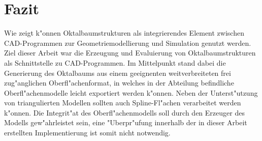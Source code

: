 %
%

\chapter{Fazit}
\label{fazit}
Wie \cite{diss_oct} zeigt k"onnen Oktalbaumstrukturen 
als integrierendes Element zwischen CAD-Programmen zur Geometriemodellierung 
und Simulation genutzt werden. Ziel dieser Arbeit war die Erzeugung und 
Evaluierung von Oktalbaumstrukturen als Schnittstelle zu CAD-Programmen. 
Im Mittelpunkt stand dabei die Generierung 
des Oktalbaums aus einem geeignenten weitverbreiteten frei zug"anglichen 
Oberfl"achenformat, in welches in der Abteilung befindliche 
Oberfl"achenmodelle leicht exportiert werden k"onnen. Neben der 
Unterst"utzung von triangulierten Modellen sollten auch Spline-Fl"achen 
verarbeitet werden k"onnen. Die Integrit"at des Oberfl"achenmodells soll
durch den Erzeuger des Modells gew"ahrleistet sein, eine "Uberpr"ufung 
innerhalb der in dieser Arbeit erstellten Implementierung ist somit nicht 
notwendig.

